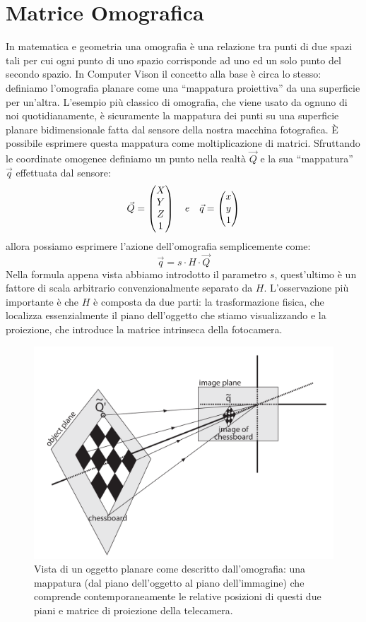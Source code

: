 \documentclass[twoside]{supsistudent}
\begin{document}
\section{Matrice Omografica}
In matematica e geometria una omografia è una relazione tra punti di due spazi tali per cui ogni punto di uno spazio corrisponde ad uno ed un solo
punto del secondo spazio. In Computer Vison il concetto alla base è circa lo stesso: definiamo l'omografia planare come una “mappatura proiettiva” da
una superficie per un’altra. L’esempio più classico di omografia, che viene usato da ognuno di noi quotidianamente, è sicuramente la mappatura dei
punti su una superficie planare bidimensionale fatta dal sensore della nostra macchina fotografica. È possibile esprimere questa mappatura come
moltiplicazione di matrici. Sfruttando le coordinate omogenee definiamo un punto nella realtà $\vec{Q}$ e la sua “mappatura” $\vec{q}$ effettuata dal sensore:
\[
\vec{Q} = \Spvek[c]{X;Y;Z;1}\quad e \quad \vec{q} = \Spvek[c]{x;y;1}
\]
allora possiamo esprimere l'azione dell'omografia semplicemente come:
\[\vec{q} = s \cdot H \cdot \vec{Q}\]
Nella formula appena vista abbiamo introdotto il parametro $s$, quest’ultimo è un fattore di scala arbitrario convenzionalmente separato da $H$. L'osservazione 
più importante è che $H$ è composta da due parti: la trasformazione fisica, che localizza essenzialmente il piano dell'oggetto che stiamo visualizzando e la 
proiezione, che introduce la matrice intrinseca della fotocamera.
\begin{figure}[H]
  \center
  \includegraphics[scale=0.50]{images/Omografia.png}
  \caption{Vista di un oggetto planare come descritto dall'omografia: una mappatura 
  (dal piano dell'oggetto al piano dell'immagine) che comprende contemporaneamente le 
  relative posizioni di questi due piani e matrice di proiezione della telecamera.}
\end{figure}
\end{document}
